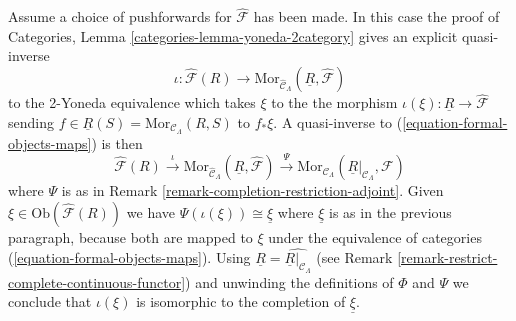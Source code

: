 \begin{remark}
\medskip \noindent
Assume a choice of pushforwards for $\widehat{\mathcal{F}}$ has been made.
In this case the proof of
Categories, Lemma \ref{categories-lemma-yoneda-2category}
gives an explicit quasi-inverse
$$
\iota :
\widehat{\mathcal{F}}(R) \longrightarrow
\text{Mor}_{\widehat{\mathcal{C}}_\Lambda}(
\underline{R}, \widehat{\mathcal{F}})
$$
to the 2-Yoneda equivalence which takes $\xi$ to the the morphism
$\iota(\xi) : \underline{R} \to \widehat{\mathcal{F}}$ sending
$f \in \underline{R}(S) = \text{Mor}_{\mathcal{C}_\Lambda}(R, S)$
to $f_*\xi$. A quasi-inverse to (\ref{equation-formal-objects-maps})
is then
$$
\widehat{\mathcal{F}}(R)
\xrightarrow {\iota}
\text{Mor}_{\widehat{\mathcal{C}}_\Lambda}(
\underline{R}, \widehat{\mathcal{F}})
\xrightarrow{\Psi}
\text{Mor}_{\mathcal{C}_\Lambda}(
\underline{R}|_{\mathcal{C}_\Lambda}, \mathcal{F})
$$
where $\Psi$ is as in
Remark \ref{remark-completion-restriction-adjoint}.  
Given $\xi \in \text{Ob}(\widehat{\mathcal{F}}(R))$ we have
$\Psi(\iota(\xi)) \cong \underline{\xi}$ where $\underline{\xi}$
is as in the previous paragraph, because both are mapped to $\xi$
under the equivalence of categories (\ref{equation-formal-objects-maps}).
Using $\underline{R} = \widehat{\underline{R}|_{\mathcal{C}_\Lambda}}$
(see Remark \ref{remark-restrict-complete-continuous-functor})
and unwinding the definitions of $\Phi$ and $\Psi$ we conclude that
$\iota(\xi)$ is isomorphic to the completion of $\underline{\xi}$.
\end{remark}

